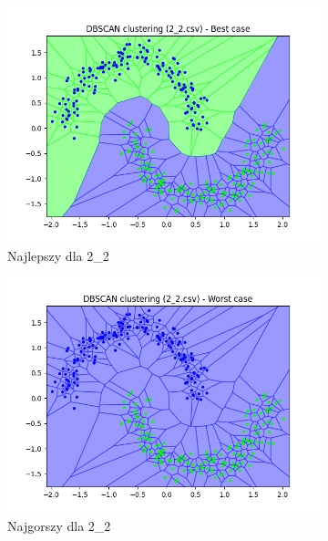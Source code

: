 \documentclass[12pt]{article}
\begin{document}
\begin{figure}[H]
\begin{subfigure}[b]{0.24\textwidth}
        \includegraphics[width=\linewidth]{img/exp_2/dbscan/2_2_best.png}
        \caption{Najlepszy dla 2\_2}
    \end{subfigure}
    \hfill
    \begin{subfigure}[b]{0.24\textwidth}
        \includegraphics[width=\linewidth]{img/exp_2/dbscan/2_2_worst.png}
        \caption{Najgorszy dla 2\_2}
    \end{subfigure}
    \hfill
    \begin{subfigure}[b]{0.24\textwidth}

\end{subfigure}
\end{figure}
\end{document}
